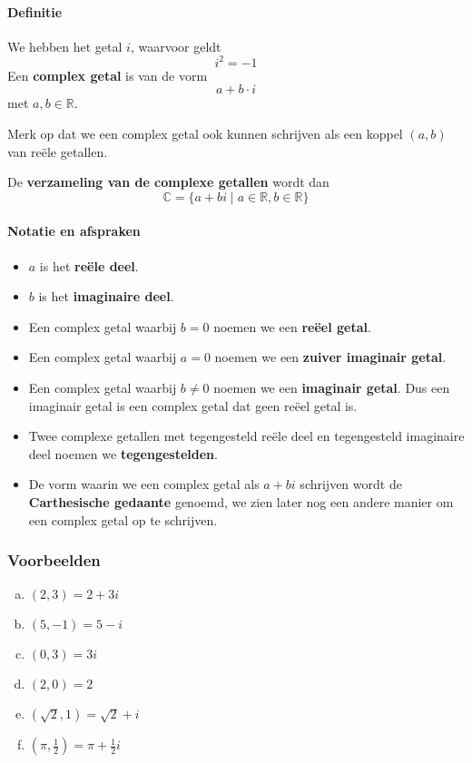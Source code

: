 \documentclass[12pt,twoside,a4]{article}
\begin{document}
\pagebreak
\paragraph*{Definitie}
\begin{mdframed}
We hebben het getal $i$, waarvoor geldt
$$i^2=-1$$
Een {\bf complex getal} is van de vorm
$$a+b\cdot i$$
met $a,b \in \mathbb{R}$.
\end{mdframed}

Merk op dat we een complex getal ook kunnen schrijven als een koppel $(a,b)$ van reële getallen.

De {\bf verzameling van de complexe getallen} wordt dan
$$\mathbb{C}=\{ a + bi \;|\; a\in\mathbb{R}, b\in\mathbb{R}\}$$

\paragraph*{Notatie en afspraken}
\begin{itemize}
  \item $a$ is het {\bf reële deel}.
  \item $b$ is het {\bf imaginaire deel}.
  \item Een complex getal waarbij $b=0$ noemen we een {\bf reëel getal}.
  \item Een complex getal waarbij $a=0$ noemen we een {\bf zuiver imaginair getal}.
  \item Een complex getal waarbij $b\neq 0$ noemen we een {\bf imaginair getal}. Dus een imaginair getal is een complex getal dat geen reëel getal is.
  \item Twee complexe getallen met tegengesteld reële deel en tegengesteld imaginaire deel noemen we {\bf tegengestelden}.
  \item De vorm waarin we een complex getal als $a+bi$ schrijven wordt de {\bf Carthesische gedaante} genoemd, we zien later nog een andere manier om een complex getal op te schrijven.
\end{itemize}

\subsubsection*{Voorbeelden}

\begin{multicols}{2}
\begin{enumerate}[(a)]
  \item $(2,3)=2+3i$
  \item $(5,-1)=5-i$
  \item $(0,3)=3i$
  \item $(2,0)=2$
  \item $(\sqrt{2},1)=\sqrt{2}+i$
  \item $(\pi, \frac{1}{2})=\pi+\frac{1}{2}i$
\end{enumerate}
\end{multicols}
\end{document}
